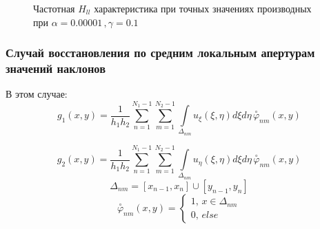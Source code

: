 \documentclass{article}
\begin{document}
\begin{figure}[H]
\caption{Частотная $H_{ll}$ характеристика при точных значениях производных при $\alpha = 0.00001\,,\gamma = 0.1$}
\end{figure}
\subsubsection{Случай восстановления по средним локальным апертурам значений наклонов}
В этом случае:
$$g_1(x,y) = \frac{1}{h_1h_2} \sum \limits_{n=1}^{N_1 - 1} \sum \limits_{m=1}^{N_2 - 1} \int \limits _{\Delta_{nm}} u_\xi(\xi,\eta) d\xi d\eta \, \overset{\circ}{\varphi}_{nm}(x,y)$$

$$g_2(x,y) = \frac{1}{h_1h_2} \sum \limits_{n=1}^{N_1 - 1} \sum \limits_{m=1}^{N_2 - 1} \int \limits _{\Delta_{nm}} u_\eta(\xi,\eta) d\xi d\eta \, \overset{\circ}{\varphi}_{nm}(x,y)$$
$$\Delta_{nm} = [x_{n-1}, x_n] \cup [y_{n-1}, y_n] $$
$$\overset{\circ}{\varphi}_{nm}(x,y) = \begin{cases} 1, \, x \in \Delta_{nm} \\ 0, \, else\end{cases}$$
\end{document}
